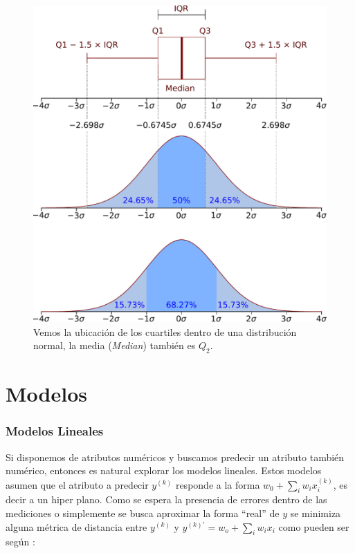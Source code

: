 \documentclass[10pt,a4paper]{article}
\begin{document}
\begin{figure}
  \centering
  \includegraphics[width=\textwidth]{iqr_fig.pdf}
  \caption{Vemos la ubicación de los cuartiles dentro de una distribución normal, la media (\textit{Median}) también es $Q_2$.}
\end{figure}

\part{Modelos}
\section{Modelos Lineales}
Si disponemos de atributos numéricos y buscamos predecir un atributo también numérico, entonces es natural explorar los modelos lineales. Estos modelos asumen que el atributo a predecir $y^{(k)}$ responde a la forma $w_0 + \sum_i w_ix_i^{(k)}$, es decir a un hiper plano. Como se espera la presencia de errores dentro de las mediciones o simplemente se busca aproximar la forma ``real'' de $y$ se minimiza alguna métrica de distancia entre $y^{(k)}$ y $y^{(k)'} = w_o + \sum_i w_ix_i$ como pueden ser según \cite{ruppert1980trimmed}:
\end{document}
